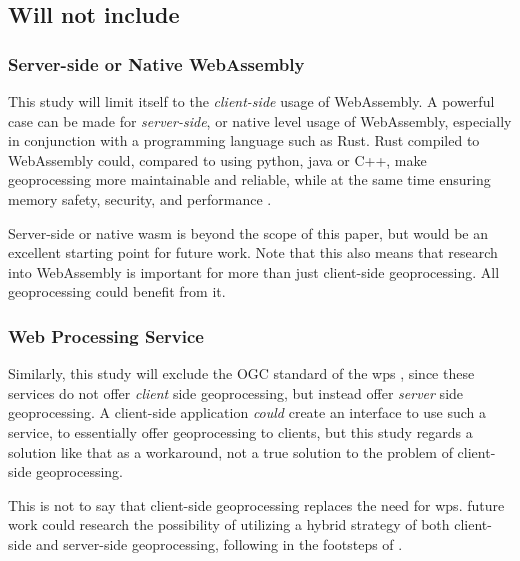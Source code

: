 \subsection*{Will not include}

\subsubsection*{ Server-side or Native WebAssembly } %

This study will limit itself to the \emph{client-side} usage of WebAssembly. 
A powerful case can be made for \emph{server-side}, or native level usage of WebAssembly, especially in conjunction with a programming language such as Rust. 
Rust compiled to WebAssembly could, compared to using python, java or C++, make geoprocessing more maintainable and reliable, while at the same time ensuring memory safety, security, and performance \cite{clack_standardizing_2019}. 

Server-side or native wasm is beyond the scope of this paper, but would be an excellent starting point for future work. Note that this also means that research into WebAssembly is important for more than just client-side geoprocessing. All geoprocessing could benefit from it.



\subsubsection*{ Web Processing Service } %

Similarly, this study will exclude the OGC standard of the \ac{wps} \cite{ogc_web_2015}, since these services do not offer \emph{client} side geoprocessing, but instead offer \emph{server} side geoprocessing. A client-side application \textit{could} create an interface to use such a service, to essentially offer geoprocessing to clients, but this study regards a solution like that as a workaround, not a true solution to the problem of client-side geoprocessing. 

This is not to say that client-side geoprocessing replaces the need for \ac{wps}. 
future work could research the possibility of utilizing a hybrid strategy of both client-side and server-side geoprocessing, following in the footsteps of \cite{panidi_hybrid_2015}. 



